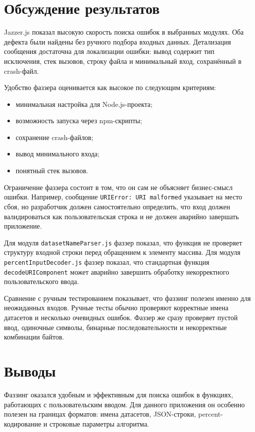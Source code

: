 \section{Обсуждение результатов} \label{ch2:sec4}

Jazzer.js показал высокую скорость поиска ошибок в выбранных модулях. Оба дефекта
были найдены без ручного подбора входных данных. Детализация сообщения достаточна
для локализации ошибки: вывод содержит тип исключения, стек вызовов, строку файла
и минимальный вход, сохранённый в crash-файл.

Удобство фаззера оценивается как высокое по следующим критериям:
\begin{itemize}
    \item минимальная настройка для Node.js-проекта;
    \item возможность запуска через npm-скрипты;
    \item сохранение crash-файлов;
    \item вывод минимального входа;
    \item понятный стек вызовов.
\end{itemize}

Ограничение фаззера состоит в том, что он сам не объясняет бизнес-смысл ошибки.
Например, сообщение \texttt{URIError: URI malformed} указывает на место сбоя, но
разработчик должен самостоятельно определить, что вход должен валидироваться как
пользовательская строка и не должен аварийно завершать приложение.

Для модуля \texttt{datasetNameParser.js} фаззер показал, что функция не проверяет
структуру входной строки перед обращением к элементу массива. Для модуля
\texttt{percentInputDecoder.js} фаззер показал, что стандартная функция
\texttt{decodeURIComponent} может аварийно завершить обработку некорректного
пользовательского ввода.

Сравнение с ручным тестированием показывает, что фаззинг полезен именно для
неожиданных входов. Ручные тесты обычно проверяют корректные имена датасетов и
несколько очевидных ошибок. Фаззер же сразу проверяет пустой ввод, одиночные
символы, бинарные последовательности и некорректные комбинации байтов.

\section{Выводы} \label{ch2:conclusion}

Фаззинг оказался удобным и эффективным для поиска ошибок в функциях, работающих
с пользовательским вводом. Для данного приложения он особенно полезен на границах
форматов: имена датасетов, JSON-строки, percent-кодирование и строковые параметры
алгоритма.
